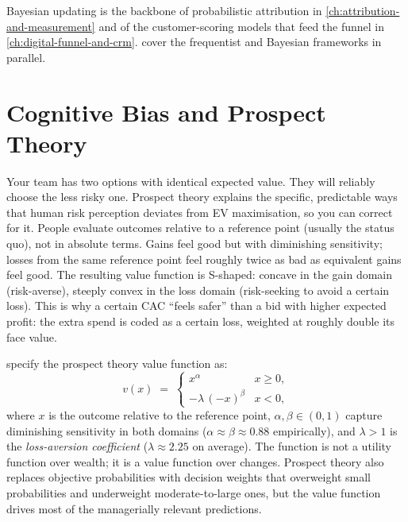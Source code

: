 Bayesian updating is the backbone of probabilistic attribution in \cref{ch:attribution-and-measurement}
and of the customer-scoring models that feed the funnel in \cref{ch:digital-funnel-and-crm}.
\textcite{anderson2019statistics} cover the frequentist and Bayesian frameworks in parallel.

\section{Cognitive Bias and Prospect Theory}\label{sec:prospect-theory}

Your team has two options with identical expected value. They will reliably choose the less risky
one. Prospect theory explains the specific, predictable ways that human risk perception deviates
from EV maximisation, so you can correct for it. People evaluate outcomes relative to a reference
point (usually the status quo), not in absolute terms. Gains feel good but with diminishing
sensitivity; losses from the same reference point feel roughly twice as bad as equivalent gains
feel good. The resulting value function is S-shaped: concave in the gain domain (risk-averse),
steeply convex in the loss domain (risk-seeking to avoid a certain loss). This is why a certain
 CAC ``feels safer'' than a  bid with higher expected profit: the
 extra spend is coded as a certain loss, weighted at roughly double its face value.

\textcite{kahneman1979prospect} specify the prospect theory value function as:
\begin{equation}\label{eq:prospect}
  v(x) \;=\;
  \begin{cases}
    x^{\alpha} & x \ge 0, \\[3pt]
    -\lambda\,(-x)^{\beta} & x < 0,
  \end{cases}
\end{equation}
where \(x\) is the outcome relative to the reference point, \(\alpha,\beta\in(0,1)\) capture
diminishing sensitivity in both domains (\(\alpha\approx\beta\approx0.88\) empirically), and
\(\lambda>1\) is the \emph{loss-aversion coefficient} (\(\lambda\approx2.25\) on average). The
function is not a utility function over wealth; it is a value function over changes.
Prospect theory also replaces objective probabilities with decision weights that overweight
small probabilities and underweight moderate-to-large ones, but the value function drives most
of the managerially relevant predictions.

